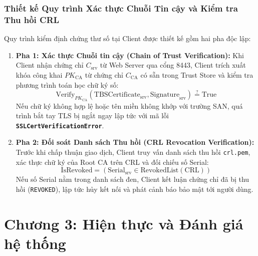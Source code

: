 \documentclass[a4paper,12pt]{article}
\begin{document}
\subsubsection{Thiết kế Quy trình Xác thực Chuỗi Tin cậy và Kiểm tra Thu hồi CRL}
Quy trình kiểm định chứng thư số tại Client được thiết kế gồm hai pha độc lập:
\begin{enumerate}
    \item \textbf{Pha 1: Xác thực Chuỗi tin cậy (Chain of Trust Verification):}
    Khi Client nhận chứng chỉ $C_{\text{srv}}$ từ Web Server qua cổng 8443, Client trích xuất khóa công khai $PK_{\text{CA}}$ từ chứng chỉ $C_{\text{CA}}$ có sẵn trong Trust Store và kiểm tra phương trình toán học chữ ký số:
    \begin{equation}
        \text{Verify}_{PK_{\text{CA}}}(\text{TBSCertificate}_{\text{srv}}, \text{Signature}_{\text{srv}}) \stackrel{?}{=} \text{True}
    \end{equation}
    Nếu chữ ký không hợp lệ hoặc tên miền không khớp với trường SAN, quá trình bắt tay TLS bị ngắt ngay lập tức với mã lỗi \textbf{\texttt{SSLCertVerificationError}}.
    \item \textbf{Pha 2: Đối soát Danh sách Thu hồi (CRL Revocation Verification):}
    Trước khi chấp thuận giao dịch, Client truy vấn danh sách thu hồi \texttt{crl.pem}, xác thực chữ ký của Root CA trên CRL và đối chiếu số Serial:
    \begin{equation}
        \text{IsRevoked} = (\text{Serial}_{\text{srv}} \in \text{RevokedList}(\text{CRL}))
    \end{equation}
    Nếu số Serial nằm trong danh sách đen, Client kết luận chứng chỉ đã bị thu hồi (\texttt{REVOKED}), lập tức hủy kết nối và phát cảnh báo bảo mật tới người dùng.
\end{enumerate}

\section{Chương 3: Hiện thực và Đánh giá hệ thống}
\end{document}
